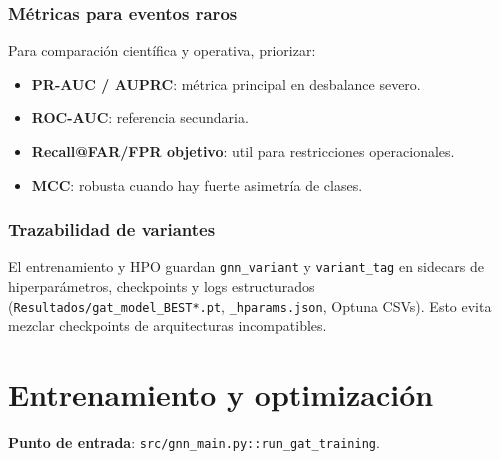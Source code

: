 \subsubsection{M\'etricas para eventos raros}
Para comparaci\'on cient\'ifica y operativa, priorizar:
\begin{itemize}[leftmargin=*]
  \item \textbf{PR-AUC / AUPRC}: m\'etrica principal en desbalance severo.
  \item \textbf{ROC-AUC}: referencia secundaria.
  \item \textbf{Recall@FAR/FPR objetivo}: util para restricciones operacionales.
  \item \textbf{MCC}: robusta cuando hay fuerte asimetr\'ia de clases.
\end{itemize}

\subsubsection{Trazabilidad de variantes}
El entrenamiento y HPO guardan \texttt{gnn\_variant} y \texttt{variant\_tag}
en sidecars de hiperpar\'ametros, checkpoints y logs estructurados
(\texttt{Resultados/gat\_model\_BEST*.pt}, \texttt{\_hparams.json}, Optuna CSVs).
Esto evita mezclar checkpoints de arquitecturas incompatibles.

\section{Entrenamiento y optimizaci\'on}
\textbf{Punto de entrada}: \texttt{src/gnn\_main.py::run\_gat\_training}.

